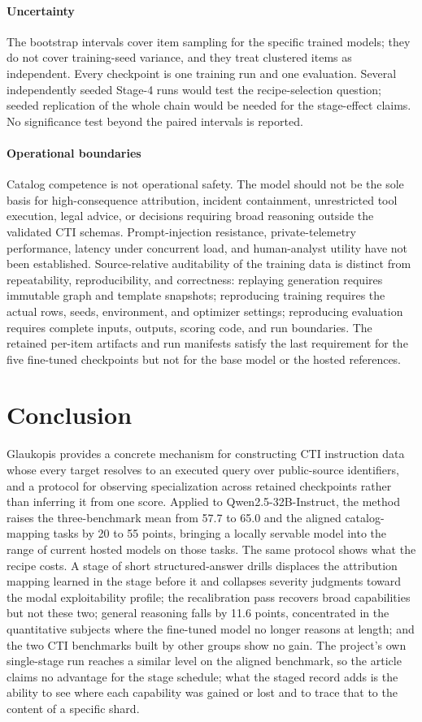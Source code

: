 \documentclass[preprint,12pt,authoryear]{elsarticle}
\begin{document}
\paragraph{Uncertainty}
The bootstrap intervals cover item sampling for the specific trained models; they do not cover training-seed variance, and they treat clustered items as independent. Every checkpoint is one training run and one evaluation. Several independently seeded Stage-4 runs would test the recipe-selection question; seeded replication of the whole chain would be needed for the stage-effect claims. No significance test beyond the paired intervals is reported.

\paragraph{Operational boundaries}
Catalog competence is not operational safety. The model should not be the sole basis for high-consequence attribution, incident containment, unrestricted tool execution, legal advice, or decisions requiring broad reasoning outside the validated CTI schemas. Prompt-injection resistance, private-telemetry performance, latency under concurrent load, and human-analyst utility have not been established. Source-relative auditability of the training data is distinct from repeatability, reproducibility, and correctness: replaying generation requires immutable graph and template snapshots; reproducing training requires the actual rows, seeds, environment, and optimizer settings; reproducing evaluation requires complete inputs, outputs, scoring code, and run boundaries. The retained per-item artifacts and run manifests satisfy the last requirement for the five fine-tuned checkpoints but not for the base model or the hosted references.

\section{Conclusion}\label{sec:conclusion}
Glaukopis provides a concrete mechanism for constructing CTI instruction data whose every target resolves to an executed query over public-source identifiers, and a protocol for observing specialization across retained checkpoints rather than inferring it from one score. Applied to Qwen2.5-32B-Instruct, the method raises the three-benchmark mean from 57.7 to 65.0 and the aligned catalog-mapping tasks by 20 to 55 points, bringing a locally servable model into the range of current hosted models on those tasks. The same protocol shows what the recipe costs. A stage of short structured-answer drills displaces the attribution mapping learned in the stage before it and collapses severity judgments toward the modal exploitability profile; the recalibration pass recovers broad capabilities but not these two; general reasoning falls by 11.6 points, concentrated in the quantitative subjects where the fine-tuned model no longer reasons at length; and the two CTI benchmarks built by other groups show no gain. The project's own single-stage run reaches a similar level on the aligned benchmark, so the article claims no advantage for the stage schedule; what the staged record adds is the ability to see where each capability was gained or lost and to trace that to the content of a specific shard.
\end{document}
